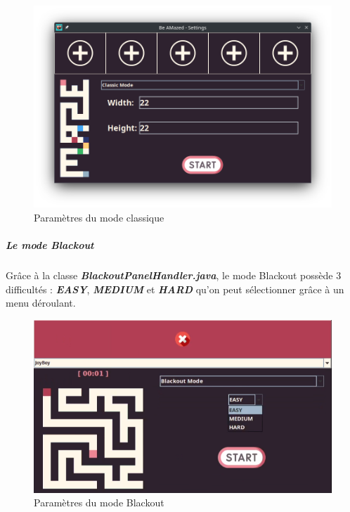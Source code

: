 \begin{figure}[h!]
    \centering
    \includegraphics[scale=0.5]{ressources/Implementation/Labyrinthe/Controleur/SettingsMenu_ClassicMode.png}
    \caption{Paramètres du mode classique}
    \label{fig:ClassicMode}
\end{figure}
\FloatBarrier

\subparagraph*{Le mode Blackout}

Grâce à la classe \textbf{\textit{BlackoutPanelHandler.java}}, le mode Blackout possède 3 difficultés : \textbf{\textit{EASY}}, \textbf{\textit{MEDIUM}} et \textbf{\textit{HARD}} qu'on peut sélectionner grâce à un menu déroulant.

\begin{figure}[h!]
    \centering
    \includegraphics[scale=0.5]{ressources/Implementation/Labyrinthe/Controleur/SettingsMenu_BlackoutMode_Difficulty.png}
    \caption{Paramètres du mode Blackout}
    \label{fig:BlackoutModeDifficulty}
\end{figure}
\FloatBarrier

